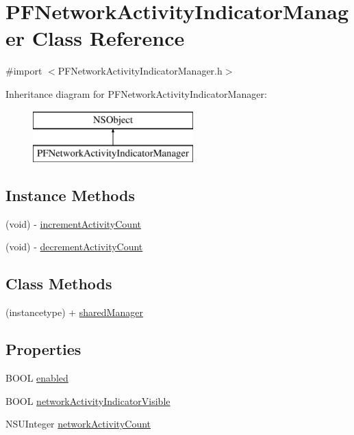 \hypertarget{interface_p_f_network_activity_indicator_manager}{}\section{P\+F\+Network\+Activity\+Indicator\+Manager Class Reference}
\label{interface_p_f_network_activity_indicator_manager}


{\ttfamily \#import $<$P\+F\+Network\+Activity\+Indicator\+Manager.\+h$>$}

Inheritance diagram for P\+F\+Network\+Activity\+Indicator\+Manager\+:\begin{figure}[H]
\begin{center}
\leavevmode
\includegraphics[height=2.000000cm]{interface_p_f_network_activity_indicator_manager}
\end{center}
\end{figure}
\subsection*{Instance Methods}
\begin{DoxyCompactItemize}
\item 
(void) -\/ \hyperlink{interface_p_f_network_activity_indicator_manager_ad68cb5b671a92d5484d141ed12a9112b}{increment\+Activity\+Count}
\item 
(void) -\/ \hyperlink{interface_p_f_network_activity_indicator_manager_a76f907d87c3a142f2620b6f3467e3dd7}{decrement\+Activity\+Count}
\end{DoxyCompactItemize}
\subsection*{Class Methods}
\begin{DoxyCompactItemize}
\item 
(instancetype) + \hyperlink{interface_p_f_network_activity_indicator_manager_ace824198a4ce77486fde9e1b364ab5bf}{shared\+Manager}
\end{DoxyCompactItemize}
\subsection*{Properties}
\begin{DoxyCompactItemize}
\item 
B\+O\+O\+L \hyperlink{interface_p_f_network_activity_indicator_manager_a8e06100fdf787d0dae5776108400d29e}{enabled}
\item 
B\+O\+O\+L \hyperlink{interface_p_f_network_activity_indicator_manager_a1e3d2adc9c714d59c15b63df0f9e8c9a}{network\+Activity\+Indicator\+Visible}
\item 
N\+S\+U\+Integer \hyperlink{interface_p_f_network_activity_indicator_manager_ab52923fab090824b0bb2609b91b1e39b}{network\+Activity\+Count}
\end{DoxyCompactItemize}


